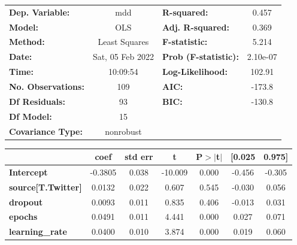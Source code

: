 \begin{center}
\begin{tabular}{lclc}
\toprule
\textbf{Dep. Variable:}              &       mdd        & \textbf{  R-squared:         } &     0.457   \\
\textbf{Model:}                      &       OLS        & \textbf{  Adj. R-squared:    } &     0.369   \\
\textbf{Method:}                     &  Least Squares   & \textbf{  F-statistic:       } &     5.214   \\
\textbf{Date:}                       & Sat, 05 Feb 2022 & \textbf{  Prob (F-statistic):} &  2.10e-07   \\
\textbf{Time:}                       &     10:09:54     & \textbf{  Log-Likelihood:    } &    102.91   \\
\textbf{No. Observations:}           &         109      & \textbf{  AIC:               } &    -173.8   \\
\textbf{Df Residuals:}               &          93      & \textbf{  BIC:               } &    -130.8   \\
\textbf{Df Model:}                   &          15      & \textbf{                     } &             \\
\textbf{Covariance Type:}            &    nonrobust     & \textbf{                     } &             \\
\bottomrule
\end{tabular}
\begin{tabular}{lcccccc}
                                     & \textbf{coef} & \textbf{std err} & \textbf{t} & \textbf{P$> |$t$|$} & \textbf{[0.025} & \textbf{0.975]}  \\
\midrule
\textbf{Intercept}                   &      -0.3805  &        0.038     &   -10.009  &         0.000        &       -0.456    &       -0.305     \\
\textbf{source[T.Twitter]}           &       0.0132  &        0.022     &     0.607  &         0.545        &       -0.030    &        0.056     \\
\textbf{dropout}                     &       0.0093  &        0.011     &     0.835  &         0.406        &       -0.013    &        0.031     \\
\textbf{epochs}                      &       0.0491  &        0.011     &     4.441  &         0.000        &        0.027    &        0.071     \\
\textbf{learning\_rate}              &       0.0400  &        0.010     &     3.874  &         0.000        &        0.019    &        0.060     \\

\end{tabular}
\end{center}
